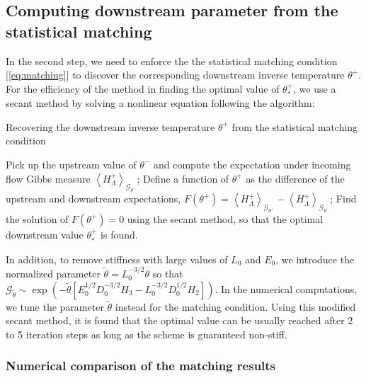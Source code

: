 \documentclass[9pt,twoside,lineno]{pnas-new}
\theoremstyle{plain}
\theoremstyle{plain}
\begin{document}
\subsection{Computing downstream parameter from the statistical matching}

In the second step, we need to enforce the the statistical matching
condition [\ref{eq:matching}] to discover the corresponding downstream
inverse temperature $\theta^{+}$. For the efficiency of the method
in finding the optimal value of $\theta_{*}^{+}$, we use a secant
method by solving a nonlinear equation following the algorithm:
\begin{algorithm}[H]
\caption{Recovering the downstream inverse temperature
$\theta^{+}$ from the statistical matching condition}\label{alg:Recovering}
\begin{algorithmic}[1]
\State Pick up the upstream value of $\theta^{-}$ and compute the expectation
under incoming flow Gibbs measure $\left\langle H_{\Lambda}^{+}\right\rangle _{\mathcal{G}_{\theta^{-}}}$;
\State Define a function of $\theta^{+}$ as the difference of the upstream
and downstream expectations, $F\left(\theta^{+}\right)=\left\langle H_{\Lambda}^{+}\right\rangle _{\mathcal{G}_{\theta^{+}}}-\left\langle H_{\Lambda}^{+}\right\rangle _{\mathcal{G}_{\theta^{-}}}$;
\State Find the solution of $F\left(\theta^{+}\right)=0$ using the secant
method, so that the optimal downstream value $\theta_{*}^{+}$ is
found.
\end{algorithmic}
\end{algorithm}

In addition, to remove stiffness with large values of $L_0$ and $E_0$, we introduce the normalized parameter $\tilde{\theta}=L_{0}^{-3/2}\theta$ so that $\mathcal{G}_{\tilde{\theta}}\sim\exp\left(-\tilde{\theta}\left[E_{0}^{1/2}D_0^{-3/2}H_{3}-L_{0}^{-3/2}D_0^{1/2}H_{2}\right]\right)$. In the numerical computations, we tune the parameter $\tilde{\theta}$ instead for the matching condition. Using this modified secant method, it is found that the optimal value can be
usually reached after 2 to 5 iteration steps as long as the scheme
is guaranteed non-stiff. 

\subsubsection*{Numerical comparison of the matching results}
\end{document}
